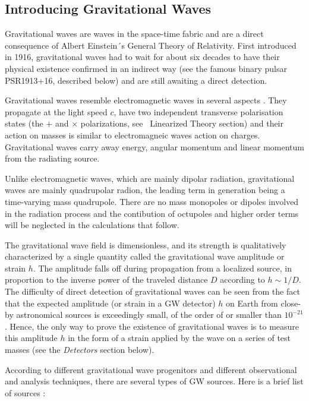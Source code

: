 \documentclass[epsf]{article}
\begin{document}
\subsection{Introducing Gravitational Waves}

Gravitational waves are waves in the space-time fabric and are a direct consequence of Albert Einstein´s General Theory of Relativity. First introduced in 1916, gravitational waves had to wait for about six decades to have their physical existence confirmed in an indirect way (see the famous binary pulsar PSR1913+16, described below) and are still awaiting a direct detection. 

Gravitational waves resemble electromagnetic waves in several aspects \cite{leo}. They propagate at the light speed $c$, have two independent transverse polarisation states (the $+$ and $\times$ polarizations, see {\ Linearized Theory} section) and their action on masses is similar to electromagneic waves action on charges. Gravitational waves carry away energy, angular momentum and linear momentum from the radiating source. 

Unlike electromagnetic waves, which are mainly dipolar radiation, gravitational waves are mainly quadrupolar radion, the leading term in generation being a time-varying mass quadrupole. There are no mass monopoles or dipoles involved in the radiation process and the contibution of octupoles and higher order terms will be neglected in the calculations that follow.

The gravitational wave field is dimensionless, and its strength is qualitatively characterized by a single quantity called 
the gravitational wave amplitude or strain $h$. The amplitude falls off during propagation from a localized source, in proportion to
the inverse power of the traveled distance $D$ according to $h \sim 1/D$. The difficulty of direct detection of
gravitational waves can be seen from the fact that the expected amplitude (or strain in a GW detector) $h$ on Earth from
close-by astronomical sources is exceedingly small, of the order of or smaller than $10^{-21}$ \cite{leo}. Hence, the only way to prove the existence of gravitational waves is to measure this amplitude $h$ in the form of a strain applied by the wave on a series of test masses (see the {\it Detectors} section below).

According to different gravitational wave progenitors and different observational and analysis techniques, there are several types of GW sources. Here is a brief list of sources \cite{abbott2006,abbott2007,leo,LIGOIFO}:
 
\end{document}
